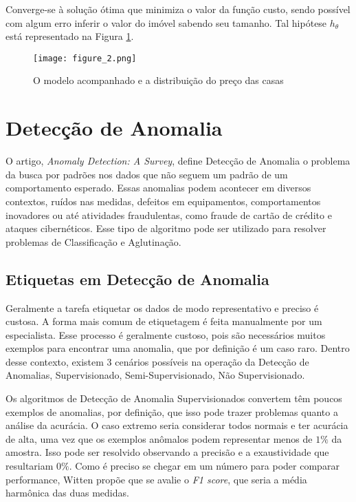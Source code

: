 Converge-se à solução ótima que minimiza o valor da função custo, sendo possível com algum erro inferir o valor do imóvel sabendo seu tamanho. Tal hipótese \(h_{\theta}\) está representado na Figura \ref{fig:casas2}.

\begin{figure}
	\centering
		\texttt{[image: figure\_2.png]}
		\caption{O modelo acompanhado e a distribuição do preço das casas}
		\label{fig:casas2}
\end{figure}



\section{Detecção de Anomalia}

O artigo, \textit{Anomaly Detection: A Survey}\cite{chandola2009anomaly}, define Detecção de Anomalia o problema da busca por padrões nos dados que não seguem um padrão de um comportamento esperado. Essas anomalias podem acontecer em diversos contextos, ruídos nas medidas, defeitos em equipamentos, comportamentos inovadores ou até atividades fraudulentas, como fraude de cartão de crédito e ataques cibernéticos. Esse tipo de algoritmo pode ser utilizado para resolver problemas de Classificação e Aglutinação.

\subsection{Etiquetas em Detecção de Anomalia}

Geralmente a tarefa etiquetar os dados de modo representativo e preciso é custosa. A forma mais comum de etiquetagem é feita manualmente por um especialista. Esse processo é geralmente custoso, pois são necessários muitos exemplos para encontrar uma anomalia, que por definição é um caso raro. Dentro desse contexto, existem 3 cenários possíveis na operação da Detecção de Anomalias, Supervisionado, Semi-Supervisionado, Não Supervisionado.

Os algoritmos de Detecção de Anomalia Supervisionados convertem têm poucos exemplos de anomalias, por definição, que isso pode trazer problemas quanto a análise da acurácia. O caso extremo seria considerar todos normais e ter acurácia de alta, uma vez que os exemplos anômalos podem representar menos de \(1\%\) da amostra. Isso pode ser resolvido observando a precisão e a exaustividade que resultariam \(0\%\). Como é preciso se chegar em um número para poder comparar performance, Witten\cite{witten2011data} propõe que se avalie o \textit{F1 score}, que seria a média harmônica das duas medidas.

